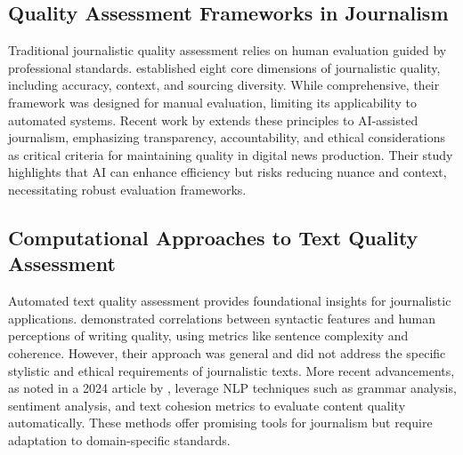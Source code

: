 \subsection{Quality Assessment Frameworks in Journalism}

Traditional journalistic quality assessment relies on human evaluation guided by professional standards. \cite{lacy2015} established eight core dimensions of journalistic quality, including accuracy, context, and sourcing diversity. While comprehensive, their framework was designed for manual evaluation, limiting its applicability to automated systems. Recent work by \cite{calvo2024} extends these principles to AI-assisted journalism, emphasizing transparency, accountability, and ethical considerations as critical criteria for maintaining quality in digital news production. Their study highlights that AI can enhance efficiency but risks reducing nuance and context, necessitating robust evaluation frameworks.


\subsection{Computational Approaches to Text Quality Assessment}

Automated text quality assessment provides foundational insights for journalistic applications. \cite{pitler2008} demonstrated correlations between syntactic features and human perceptions of writing quality, using metrics like sentence complexity and coherence. However, their approach was general and did not address the specific stylistic and ethical requirements of journalistic texts. More recent advancements, as noted in a 2024 article by \cite{quantum2024}, leverage \ac{NLP} techniques such as grammar analysis, sentiment analysis, and text cohesion metrics to evaluate content quality automatically. These methods offer promising tools for journalism but require adaptation to domain-specific standards.

